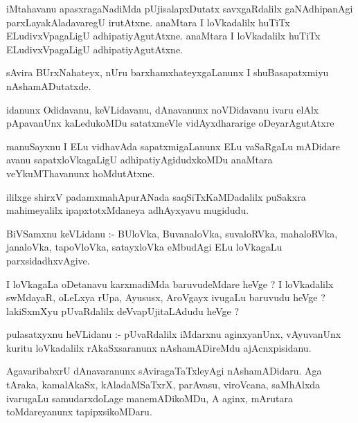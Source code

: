 \documentclass{article}
\begin{document}
\begin{mn}
iMtahavanu  apasxragaNadiMda  pUjisalapxDutatx  savxgaRdalilx  gaNAdhipanAgi  parxLayakAladavaregU  
irutAtxne.  anaMtara  I  loVkadalilx  huTiTx  ELudivxVpagaLigU  adhipatiyAgutAtxne.  anaMtara  I  
loVkadalilx  huTiTx  ELudivxVpagaLigU  adhipatiyAgutAtxne.
\end{mn}

\begin{mn}
sAvira  BUrxNahateyx,  nUru  barxhamxhateyxgaLanunx  I  shuBasapatxmiyu  nAshamADutatxde.
\end{mn}

\begin{mn}
idanunx  Odidavanu,  keVLidavanu,  dAnavanunx  noVDidavanu  ivaru  elAlx  pApavanUnx  kaLedukoMDu  
satatxmeVle  vidAyxdhararige  oDeyarAgutAtxre
\end{mn}

\begin{mn}
manuSayxnu  I  ELu  vidhavAda  sapatxmigaLanunx  ELu  vaSaRgaLu  mADidare  avanu  
sapatxloVkagaLigU  adhipatiyAgidudxkoMDu  anaMtara  veYkuMThavanunx  hoMdutAtxne.
\end{mn}

\begin{mn}
ililxge  shirxV  padamxmahApurANada  saqSiTxKaMDadalilx  puSakxra  mahimeyalilx  ipapxtotxMdaneya  adhAyxyavu  mugidudu.
\end{mn}




\begin{mn}
BiVSamxnu  keVLidanu :- BUloVka,  BuvanaloVka,  suvaloRVka,  mahaloRVka,  janaloVka,  
tapoVloVka,  satayxloVka  eMbudAgi  ELu  loVkagaLu  parxsidadhxvAgive.
\end{mn}

\begin{mn}
I  loVkagaLa  oDetanavu  karxmadiMda  baruvudeMdare  heVge ?  I  loVkadalilx  swMdayaR,  oLeLxya  rUpa,  
Ayususx,  AroVgayx  ivugaLu  baruvudu  heVge ?  lakiSxmXyu  pUvaRdalilx  deVvapUjitaLAdudu  heVge ?
\end{mn}

\begin{mn}
pulasatxyxnu  heVLidanu :- pUvaRdalilx  iMdarxnu  aginxyanUnx,  vAyuvanUnx  kuritu  loVkadalilx  
rAkaSxsaranunx  nAshamADireMdu  ajAcnxpisidanu.
\end{mn}

\begin{mn}
AgavaribabxrU  dAnavaranunx  sAviragaTaTxleyAgi  nAshamADidaru.  Aga  tAraka,  kamalAkaSx,  
kAladaMSaTxrX,  parAvasu,  viroVcana,  saMhAlxda  ivarugaLu  samudarxdoLage  manemADikoMDu,  
A  aginx,  mArutara  toMdareyanunx  tapipxsikoMDaru.
\end{mn}
\end{document}
